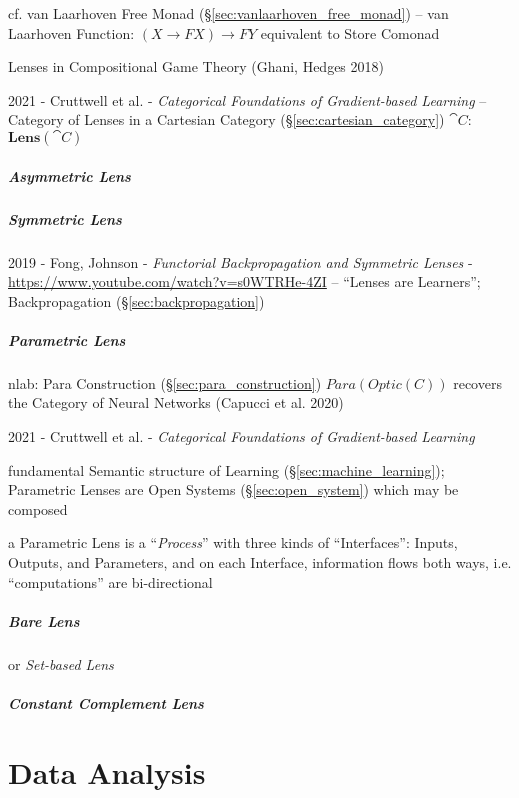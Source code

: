 \fist cf. van Laarhoven Free Monad (\S\ref{sec:vanlaarhoven_free_monad}) -- van
Laarhoven Function: $(X \rightarrow F X) \rightarrow F Y$ equivalent to Store
Comonad

Lenses in Compositional Game Theory (Ghani, Hedges 2018)

2021 - Cruttwell et al. - \emph{Categorical Foundations of Gradient-based
Learning} -- Category of Lenses in a Cartesian Category
(\S\ref{sec:cartesian_category}) $\cat{C}$: $\mathbf{Lens}(\cat{C})$



\subparagraph{Asymmetric Lens}\label{sec:asymmetric_lens}\hfill

\subparagraph{Symmetric Lens}\label{sec:symmetric_lens}\hfill

2019 - Fong, Johnson - \emph{Functorial Backpropagation and Symmetric Lenses} -
\url{https://www.youtube.com/watch?v=s0WTRHe-4ZI} -- ``Lenses are Learners'';
\fist Backpropagation (\S\ref{sec:backpropagation})



\subparagraph{Parametric Lens}\label{sec:parametric_lens}\hfill


nlab: Para Construction (\S\ref{sec:para_construction}) $Para(Optic(C))$
recovers the Category of Neural Networks (Capucci et al. 2020)

2021 - Cruttwell et al. - \emph{Categorical Foundations of Gradient-based
Learning}

fundamental Semantic structure of Learning (\S\ref{sec:machine_learning});
Parametric Lenses are Open Systems (\S\ref{sec:open_system}) which may be
composed

a Parametric Lens is a ``\emph{Process}'' with three kinds of ``Interfaces'':
Inputs, Outputs, and Parameters, and on each Interface, information flows both
ways, i.e. ``computations'' are bi-directional



\subparagraph{Bare Lens}\label{sec:bare_lens}\hfill

or \emph{Set-based Lens}



\subparagraph{Constant Complement Lens}
\label{sec:constant_complement_lens}\hfill



\section{Data Analysis}\label{sec:data_analysis}

